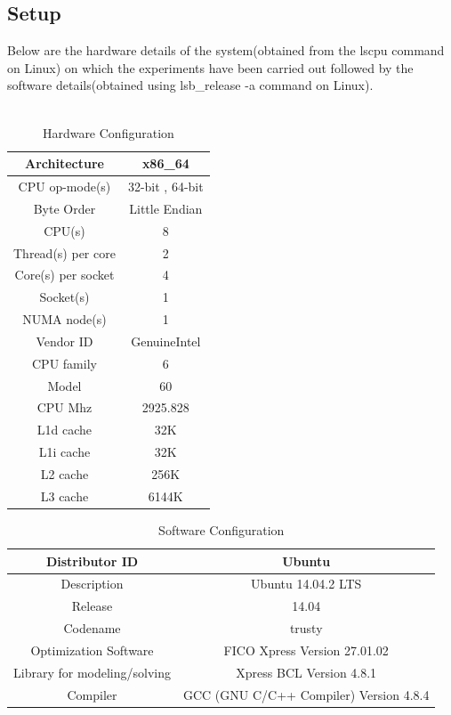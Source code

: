 \documentclass[a4paper, 12pt]{article}
\begin{document}
\subsection{Setup}
Below are the hardware details of the system(obtained from the lscpu command on Linux) on which the experiments have been carried out followed by the software details(obtained using lsb_release -a command on Linux).\\~\\
\begin{table}[!htbp]
\centering
\begin{tabular}{ |c|c| }
\hline
Architecture & x86_64 \\
\hline
CPU op-mode(s) & 32-bit , 64-bit \\
\hline
Byte Order & Little Endian \\
\hline
CPU(s) & 8 \\
\hline
Thread(s) per core & 2 \\
\hline
Core(s) per socket & 4 \\
\hline
Socket(s) & 1 \\
\hline
NUMA node(s) & 1 \\
\hline
Vendor ID & GenuineIntel \\
\hline
CPU family & 6 \\
\hline
Model & 60 \\
\hline
CPU Mhz & 2925.828 \\
\hline
L1d cache & 32K \\
\hline
L1i cache & 32K \\
\hline
L2 cache & 256K \\
\hline
L3 cache & 6144K \\
\hline
\end{tabular}
\caption{Hardware Configuration}
\label{table:1}
\end{table}
\begin{table}[!htbp]
\centering
\begin{tabular}{ |c|c| }
\hline
Distributor ID & Ubuntu \\
\hline
Description & Ubuntu 14.04.2 LTS \\
\hline
Release & 14.04 \\
\hline
Codename & trusty \\
\hline
Optimization Software & FICO Xpress Version 27.01.02 \\
\hline
Library for modeling/solving & Xpress BCL Version 4.8.1 \\
\hline
Compiler & GCC (GNU C/C++ Compiler) Version 4.8.4 \\
\hline
\end{tabular}
\caption{Software Configuration}
\label{table:2}
\end{table}
\end{document}
